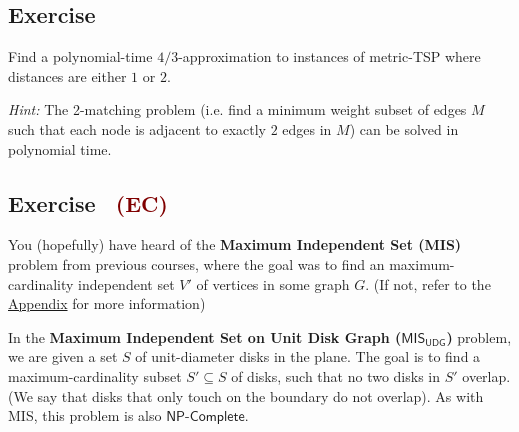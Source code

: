 \documentclass{article}
\newcounter{counter}
\newcommand{\Exercise}{Exercise \stepcounter{counter}\thecounter}
\begin{document}
\subsection*{\Exercise}
    Find a polynomial-time $4/3$-approximation to instances of metric-TSP where distances are either $1$ or $2$.

    \vspace{2mm}
    \textit{Hint:} The 2-matching problem (i.e. find a minimum weight subset of edges $M$ such that each node is adjacent to exactly $2$ edges in $M$) can be solved in polynomial time.

\subsection*{\Exercise \ \textcolor{Maroon}{(EC)}}
    You (hopefully) have heard of the \textbf{Maximum Independent Set (\textsf{MIS})} problem from previous courses, where the goal was to find an maximum-cardinality independent set $V'$ of vertices in some graph $G$. (If not, refer to the \hyperref[sec:appendix]{Appendix} for more information)

    \vspace{3mm}
    In the \textbf{Maximum Independent Set on Unit Disk Graph ($\textsf{MIS}_{\textsf{UDG}}$)} problem, we are given a set \( S \) of unit-diameter disks in the plane. The goal is to find a maximum-cardinality subset \( S' \subseteq S \) of disks, such that no two disks in \( S' \) overlap. (We say that disks that only touch on the boundary do not overlap). As with \textsf{MIS}, this problem is also $\textsf{NP-Complete}$.
    
\end{document}

